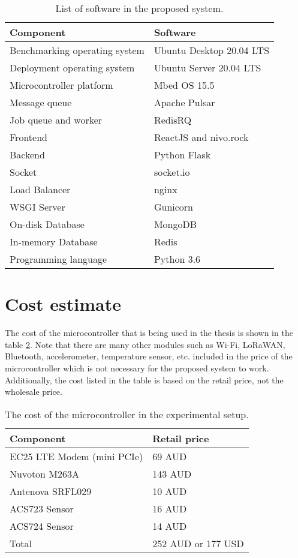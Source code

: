\documentclass[../thesis.tex]{subfiles}
\begin{document}
\begin{table}[h!]
\begin{center}
\caption{List of software in the proposed system.}
\label{tab:softwareList}
\begin{tabular}{l|l}
\toprule
\textbf{Component} & \textbf{Software}\\
\midrule
Benchmarking operating system & Ubuntu Desktop 20.04 LTS\\
Deployment operating system & Ubuntu Server 20.04 LTS\\
Microcontroller platform & Mbed OS 15.5\\
Message queue & Apache Pulsar\\
Job queue and worker & RedisRQ\\
Frontend & ReactJS and nivo.rock\\
Backend & Python Flask\\
Socket & socket.io\\
Load Balancer & nginx\\
WSGI Server & Gunicorn\\
On-disk Database & MongoDB\\
In-memory Database & Redis\\
Programming language & Python 3.6\\
\bottomrule
\end{tabular}
\end{center}
\end{table}

\section{Cost estimate}

The cost of the microcontroller that is being used in the thesis is shown in the table \ref{tab:mcestimateexp}. Note that there are many other modules such as Wi-Fi, LoRaWAN, Bluetooth, accelerometer, temperature sensor, etc. included in the price of the microcontroller which is not necessary for the proposed system to work. Additionally, the cost listed in the table is based on the retail price, not the wholesale price.

\begin{table}[h!]
\begin{center}
\caption{The cost of the microcontroller in the experimental setup.}
\label{tab:mcestimateexp}
\begin{tabular}{l|l}
\toprule
\textbf{Component} & \textbf{Retail price}\\
\midrule
EC25 LTE Modem (mini PCIe) & 69 AUD\\
Nuvoton M263A & 143 AUD\\
Antenova SRFL029 & 10 AUD\\
ACS723 Sensor & 16 AUD\\
ACS724 Sensor & 14 AUD\\
\midrule
Total & 252 AUD or 177 USD\\
\bottomrule
\end{tabular}
\end{center}
\end{table}
\end{document}
